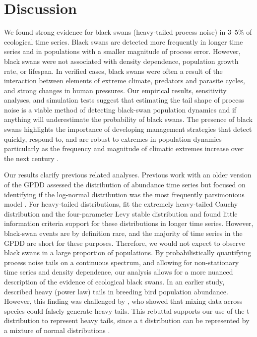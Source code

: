 \section{Discussion}

We found strong evidence for black swans (heavy-tailed process noise) in 3--5\% of ecological time series. Black swans are detected more frequently in longer time series and in populations with a smaller magnitude of process error. However, black swans were not associated with density dependence, population growth rate, or lifespan. In verified cases, black swans were often a result of the interaction between elements of extreme climate, predators and parasite cycles, and strong changes in human pressures. Our empirical results, sensitivity analyses, and simulation tests suggest that estimating the tail shape of process noise is a viable method of detecting black-swan population dynamics and if anything will underestimate the probability of black swans. The presence of black swans highlights the importance of developing management strategies that detect quickly, respond to, and are robust to extremes in population dynamics --- particularly as the frequency and magnitude of climatic extremes increase over the next century \citep{easterling2000,ipcc2012}.

Our results clarify previous related analyses. Previous work with an older version of the GPDD assessed the distribution of abundance time series but focused on identifying if the log-normal distribution was the most frequently parsimonious model \citep{halley2002}. For heavy-tailed distributions, \citet{halley2002} fit the extremely heavy-tailed Cauchy distribution and the four-parameter Levy stable distribution and found little information criteria support for these distributions in longer time series. However, black-swan events are by definition rare, and the majority of time series in the GPDD are short for these purposes. Therefore, we would not expect to observe black swans in a large proportion of populations. By probabilistically quantifying process noise tails on a continuous spectrum, and allowing for non-stationary time series and density dependence, our analysis allows for a more nuanced description of the evidence of ecological black swans. In an earlier study, \citet{keitt1998} described heavy (power law) tails in breeding bird population abundance. However, this finding was challenged by \citet{allen2001}, who showed that mixing data across species could falsely generate heavy tails. This rebuttal supports our use of the t distribution to represent heavy tails, since a t distribution can be represented by a mixture of normal distributions \citep[with the same mean and inverse-gamma-distributed variances,][]{gelman2014}.

